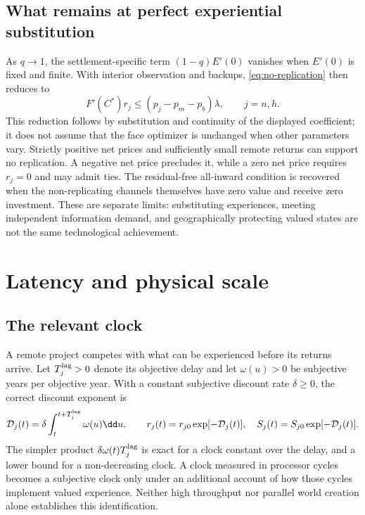 \subsection{What remains at perfect experiential substitution}
As $q\to1$, the settlement-specific term $(1-q)E'(0)$ vanishes when
$E'(0)$ is fixed and finite. With interior observation and backups,
\cref{eq:no-replication} then reduces to
\begin{equation}
 F'(C^*)r_j\leq(p_j-p_m-p_b)\lambda,\qquad j=n,h.
 \label{eq:replication-reduced}
\end{equation}
This reduction follows by substitution and continuity of the displayed
coefficient; it does not assume that the face optimizer is unchanged
when other parameters vary. Strictly positive net prices and sufficiently
small remote returns can support no replication. A negative net price
precludes it, while a zero net price requires $r_j=0$ and may admit ties.
The residual-free all-inward condition is recovered when the non-replicating
channels themselves have zero value and receive zero investment. These
are separate limits: substituting experiences, meeting independent
information demand, and geographically protecting valued states are not
the same technological achievement.

\section{Latency and physical scale}
\label{sec:latency}
\subsection{The relevant clock}
A remote project competes with what can be experienced before its returns
arrive. Let $T_j^{\rm lag}>0$ denote its objective delay and let
$\omega(u)>0$ be subjective years per objective year. With a constant
subjective discount rate $\delta\geq0$, the correct discount exponent is
\begin{equation}
 \mathcal D_j(t)=\delta\int_t^{t+T_j^{\rm lag}}\omega(u)\dd u,
 \qquad r_j(t)=r_{j0}\exp[-\mathcal D_j(t)],\quad
 S_j(t)=S_{j0}\exp[-\mathcal D_j(t)].
 \label{eq:subjective-delay}
\end{equation}
The simpler product $\delta\omega(t)T_j^{\rm lag}$ is exact for a clock
constant over the delay, and a lower bound for a non-decreasing clock.
A clock measured in processor cycles becomes a subjective clock only
under an additional account of how those cycles implement valued
experience. Neither high throughput nor parallel world creation alone
establishes this identification.

